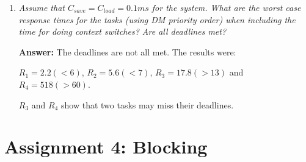 \documentclass[a4paper,10pt]{article}
\newcommand{\answer}{\textbf{Answer: }}
\begin{document}
\begin{enumerate}
	\item \emph{Assume that $C_{save} = C_{load} = 0.1 ms$ for the system. What are the worst case response times for the tasks (using DM priority order) when including the time for doing context switches? Are all deadlines met?}
	
	\answer The deadlines are not all met. The results were:
	
	$R_1 = 2.2 (<6)$, $R_2 = 5.6 (<7)$, $R_3 = 17.8 (>13)$ and $R_4 = 518 (>60)$.
	
	$R_3$ and $R_4$ show that two tasks may miss their deadlines.
	
\end{enumerate}

\section{Assignment 4: Blocking}
\end{document}
